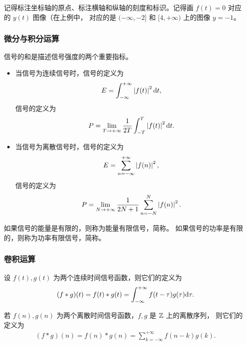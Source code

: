 \begin{note}
    记得标注坐标轴的原点、标注横轴和纵轴的刻度和标识。记得画 $f(t) = 0$ 对应的 $y(t)$ 图像（在上例中，
    对应的是 $(-\infty, -2]$ 和 $[4, +\infty)$ 上的图像 $y = -1$。
\end{note}

\subsubsection{微分与积分运算}

\begin{definition}[信号的能量与功率]
    信号的和是描述信号强度的两个重要指标。
    \begin{itemize}
        \item 当信号为连续信号时，信号的定义为
            \begin{align*}
                E = \int_{-\infty}^{+\infty}\left|f(t)\right|^2\mathrm{d}t,
            \end{align*}
            信号的定义为
            \begin{align*}
                P = \lim_{T \to +\infty}\frac{1}{2T}\int_{-T}^{T}\left|f(t)\right|^2\mathrm{d}t.
            \end{align*}
        \item 当信号为离散信号时，信号的定义为
            \begin{align*}
                E = \sum_{n = -\infty}^{+\infty}\left|f(n)\right|^2,
            \end{align*}
            信号的定义为
            \begin{align*}
                P = \lim_{N \to +\infty}\frac{1}{2N + 1}\sum_{n = -N}^{N}\left|f(n)\right|^2.
            \end{align*}
    \end{itemize}
\end{definition}

\begin{definition}[能量信号与功率信号]
    如果信号的能量是有限的，则称为能量有限信号，简称。
    如果信号的功率是有限的，则称为功率有限信号，简称。
\end{definition}

\subsubsection{卷积运算}

\begin{definition}
    设 $f(t), g(t)$ 为两个连续时间信号函数，则它们的定义为
    \begin{align*}
        (f * g)(t) = f(t) * g(t) = \int_{-\infty}^{+\infty}f(t - \tau)g(\tau)\mathrm{d}\tau.
    \end{align*}

    若 $f(n), g(n)$ 为两个离散时间信号函数，$f, g$ 是 $\mathbb{Z}$ 上的离散序列，
    则它们的定义为
    \begin{align*}
        (f * g)(n) = f(n) * g(n) = \sum_{k = -\infty}^{+\infty}f(n - k)g(k).
    \end{align*}
\end{definition}

